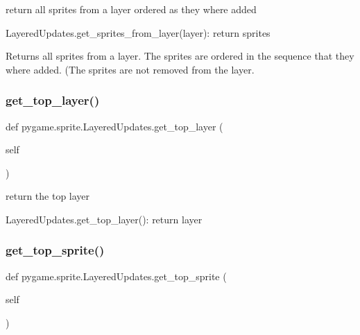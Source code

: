 \begin{DoxyVerb}return all sprites from a layer ordered as they where added

LayeredUpdates.get_sprites_from_layer(layer): return sprites

Returns all sprites from a layer. The sprites are ordered in the
sequence that they where added. (The sprites are not removed from the
layer.\end{DoxyVerb}
 \mbox{\label{classpygame_1_1sprite_1_1_layered_updates_aa85256f739f6c0386e94b026a561c993}} 
\subsubsection{\texorpdfstring{get\+\_\+top\+\_\+layer()}{get\_top\_layer()}}
{\footnotesize\ttfamily def pygame.\+sprite.\+Layered\+Updates.\+get\+\_\+top\+\_\+layer (\begin{DoxyParamCaption}\item[{}]{self }\end{DoxyParamCaption})}

\begin{DoxyVerb}return the top layer

LayeredUpdates.get_top_layer(): return layer\end{DoxyVerb}
 \mbox{\label{classpygame_1_1sprite_1_1_layered_updates_ab9fbda5abb958feddcad849b76d5f2e4}} 
\subsubsection{\texorpdfstring{get\+\_\+top\+\_\+sprite()}{get\_top\_sprite()}}
{\footnotesize\ttfamily def pygame.\+sprite.\+Layered\+Updates.\+get\+\_\+top\+\_\+sprite (\begin{DoxyParamCaption}\item[{}]{self }\end{DoxyParamCaption})}

